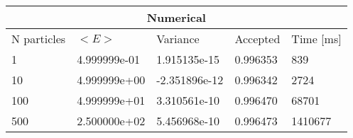 \begin{tabular}{|l|l|l|l|l|}
\hline 
\multicolumn{5}{|c|}{Numerical}\\ 
\hline 
N particles & $<E>$ & Variance & Accepted & Time [ms]\\ 
 \hline 
1 & 4.999999e-01 & 1.915135e-15 & 0.996353 & 839 \\ 
\hline10 & 4.999999e+00 & -2.351896e-12 & 0.996342 & 2724 \\ 
\hline100 & 4.999999e+01 & 3.310561e-10 & 0.996470 & 68701 \\ 
\hline500 & 2.500000e+02 & 5.456968e-10 & 0.996473 & 1410677 \\ 
\hline\end{tabular}